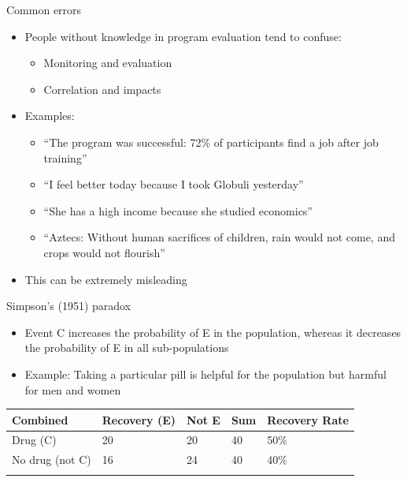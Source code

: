 \documentclass[
  ignorenonframetext,
]{beamer}
\providecommand{\tightlist}{%
  \setlength{\itemsep}{0pt}\setlength{\parskip}{0pt}}
\begin{document}
\begin{frame}{Common errors}
\label{common-errors}
\begin{itemize}
\tightlist
\item
  People without knowledge in program evaluation tend to confuse:

  \begin{itemize}
  \tightlist
  \item
    Monitoring and evaluation\\
  \item
    Correlation and impacts\\
  \end{itemize}
\item
  Examples:

  \begin{itemize}
  \tightlist
  \item
    ``The program was successful: 72\% of participants find a job after
    job training''\\
  \item
    ``I feel better today because I took Globuli yesterday''\\
  \item
    ``She has a high income because she studied economics''\\
  \item
    ``Aztecs: Without human sacrifices of children, rain would not come,
    and crops would not flourish''\\
  \end{itemize}
\item
  This can be extremely misleading
\end{itemize}
\end{frame}

\begin{frame}{Simpson's (1951) paradox}
\label{simpsons-1951-paradox}
\begin{itemize}
\tightlist
\item
  Event C increases the probability of E in the population, whereas it
  decreases the probability of E in all sub-populations\\
\item
  Example: Taking a particular pill is helpful for the population but
  harmful for men and women
\end{itemize}

\begin{longtable}[]{@{}lllll@{}}
\toprule\noalign{}
Combined & Recovery (E) & Not E & Sum & Recovery Rate \\
\midrule\noalign{}
\endhead
Drug (C) & 20 & 20 & 40 & 50\% \\
No drug (not C) & 16 & 24 & 40 & 40\% \\
\bottomrule\noalign{}
\end{longtable}
\end{frame}
\end{document}

